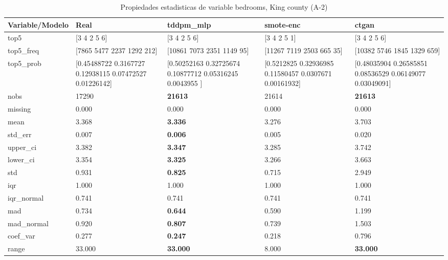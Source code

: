 \begin{table}[H]
\centering
\fontsize{8}{14}\selectfont
\caption{Propiedades  estadisticas de variable bedrooms, King county (A-2)}
\label{table-stats-king county-a-2-bedrooms}
\begin{tabular}{|l|m{10em}|m{10em}|m{10em}|m{10em}|}
\hline
 \rowcolor[gray]{0.8}
Variable/Modelo & Real & tddpm\_mlp & smote-enc & ctgan \\
\hline top5 & [3 4 2 5 6] & [3 4 2 5 6] & [3 4 2 5 1] & [3 4 2 5 6] \\
\hline top5\_freq & [7865 5477 2237 1292  212] & [10861  7073  2351  1149    95] & [11267  7119  2503   665    35] & [10382  5746  1845  1329   659] \\
\hline top5\_prob & [0.45488722 0.3167727  0.12938115 0.07472527 0.01226142] & [0.50252163 0.32725674 0.10877712 0.05316245 0.0043955 ] & [0.5212825  0.32936985 0.11580457 0.0307671  0.00161932] & [0.48035904 0.26585851 0.08536529 0.06149077 0.03049091] \\
\hline nobs & 17290 & \bfseries 21613 & \cellcolor[rgb]{0.9, 0.54, 0.52} 21614 & \bfseries 21613 \\
\hline missing & 0.000 & 0.000 & 0.000 & 0.000 \\
\hline mean & 3.368 & \bfseries 3.336 & 3.276 & \cellcolor[rgb]{0.9, 0.54, 0.52} 3.703 \\
\hline std\_err & 0.007 & \bfseries 0.006 & 0.005 & \cellcolor[rgb]{0.9, 0.54, 0.52} 0.020 \\
\hline upper\_ci & 3.382 & \bfseries 3.347 & 3.285 & \cellcolor[rgb]{0.9, 0.54, 0.52} 3.742 \\
\hline lower\_ci & 3.354 & \bfseries 3.325 & 3.266 & \cellcolor[rgb]{0.9, 0.54, 0.52} 3.663 \\
\hline std & 0.931 & \bfseries 0.825 & 0.715 & \cellcolor[rgb]{0.9, 0.54, 0.52} 2.949 \\
\hline iqr & 1.000 & 1.000 & 1.000 & 1.000 \\
\hline iqr\_normal & 0.741 & 0.741 & 0.741 & 0.741 \\
\hline mad & 0.734 & \bfseries 0.644 & 0.590 & \cellcolor[rgb]{0.9, 0.54, 0.52} 1.199 \\
\hline mad\_normal & 0.920 & \bfseries 0.807 & 0.739 & \cellcolor[rgb]{0.9, 0.54, 0.52} 1.503 \\
\hline coef\_var & 0.277 & \bfseries 0.247 & 0.218 & \cellcolor[rgb]{0.9, 0.54, 0.52} 0.796 \\
\hline range & 33.000 & \bfseries 33.000 & \cellcolor[rgb]{0.9, 0.54, 0.52} 8.000 & \bfseries 33.000 \\

\end{tabular}
\end{table}
